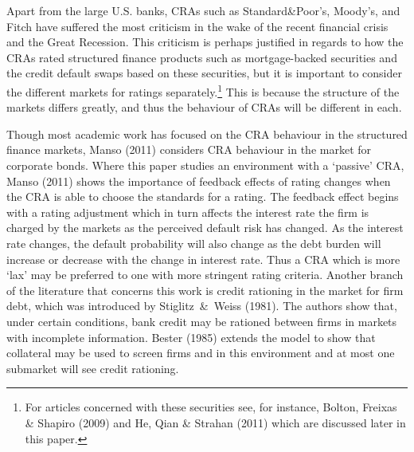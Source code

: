 \documentclass[notitlepage]{article}
\begin{document}
Apart from the large U.S. banks, CRAs such as Standard\&Poor's, Moody's, and Fitch have suffered the most criticism in the wake of the recent financial crisis and the Great Recession. This criticism is perhaps justified in regards to how the CRAs rated structured finance products such as mortgage-backed securities and the credit default swaps based on these securities, but it is important to consider the different markets for ratings separately.\footnote{For articles concerned with these securities see, for instance, Bolton, Freixas \& Shapiro (2009) and He, Qian \& Strahan (2011) which are discussed later in this paper.} This is because the structure of the markets differs greatly, and thus the behaviour of CRAs will be different in each.

Though most academic work has focused on the CRA behaviour in the structured finance markets, Manso (2011) considers CRA behaviour in the market for corporate bonds. Where this paper studies an environment with a `passive' CRA, Manso (2011) shows the importance of feedback effects of rating changes when the CRA is able to choose the standards for a rating. The feedback effect begins with a rating adjustment which in turn affects the interest rate the firm is charged by the markets as the perceived default risk has changed. As the interest rate changes, the default probability will also change as the debt burden will increase or decrease with the change in interest rate. Thus a CRA which is more `lax' may be preferred to one with more stringent rating criteria. Another branch of the literature that concerns this work is credit rationing in the market for firm debt, which was introduced by Stiglitz~\&~Weiss (1981). The authors show that, under certain conditions, bank credit may be rationed between firms in markets with incomplete information. Bester (1985) extends the model to show that collateral may be used to screen firms and in this environment and at most one submarket will see credit rationing.
\end{document}
